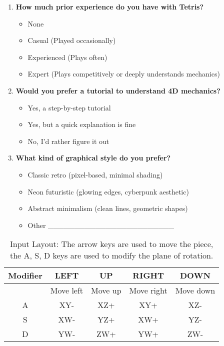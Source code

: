 \documentclass{article}
\begin{document}
\begin{multicols}{2}
\begin{enumerate}
    \item \textbf{How much prior experience do you have with Tetris?}
    \begin{itemize}
        \item None
        \item Casual (Played occasionally)
        \item Experienced (Plays often)
        \item Expert (Plays competitively or deeply understands mechanics)
    \end{itemize}

    \item \textbf{Would you prefer a tutorial to understand 4D mechanics?}
    \begin{itemize}
        \item Yes, a step-by-step tutorial
        \item Yes, but a quick explanation is fine
        \item No, I'd rather figure it out
    \end{itemize}

    \item \textbf{What kind of graphical style do you prefer?}
    \begin{itemize}
        \item Classic retro (pixel-based, minimal shading)
        \item Neon futuristic (glowing edges, cyberpunk aesthetic)
        \item Abstract minimalism (clean lines, geometric shapes)
        \item Other \_\_\_\_\_\_\_\_\_\_\_\_\_\_\_\_\_\_\_\_\_\_\_\_
    \end{itemize}
\end{enumerate}
\end{multicols}
\begin{table}[H]
    \centering
    \begin{tabular}{|c|c|c|c|c|}
    \hline
    Modifier & LEFT & UP & RIGHT& DOWN\\
    \hline
     & Move left & Move up & Move right & Move down\\
    A & XY- & XZ+ & XY+ & XZ-\\
    S & XW- & YZ+ & XW+ & YZ-\\
    D & YW- & ZW+ & YW+ & ZW-\\
    \hline
    \end{tabular}
    \caption{Input Layout: The arrow keys are used to move the piece, the A, S, D keys are used to modify the plane of rotation.}
    \label{tab:input}
\end{table}
\end{document}

